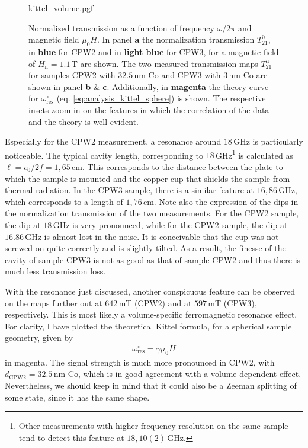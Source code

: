 \begin{figure}[b]
    \centering
    {kittel_volume.pgf}
    \caption[Normalized transmission of samples CPW2 and CPW3]{Normalized transmission as a function of frequency $\omega/2\pi$ and magnetic field $\mu_0H$. In panel \textbf{\color{antiseeblau100}a} the normalization transmission $T_{21}^0$, in \textbf{\color{seeblau100}blue} for CPW2 and in \textbf{\color{seeblau65}light blue} for CPW3, for a magnetic field of $H_\text{n}=1.1\,$T are shown. The two measured transmission maps $T_{21}^\text{n}$ for samples CPW2 with $32.5\,$nm Co and CPW3 with $3\,$nm Co are shown in panel \textbf{\color{antiseeblau100}b} \& \textbf{\color{antiseeblau100}c}. Additionally, in \textbf{\color{antiseeblau100}magenta} the theory curve for $\omega_\text{res}^\circ$ (eq. \ref{eq:analysis_kittel_sphere}) is shown. The respective insets zoom in on the features in which the correlation of the data and the theory is well evident.}
    \label{fig:analysis_kittel_volume}
\end{figure}

Especially for the CPW2 measurement, a resonance around $18\,$GHz is particularly noticeable. The typical cavity length, corresponding to $18\,$GHz\footnote{Other measurements with higher frequency resolution on the same sample tend to detect this feature at $18,10(2)\,$GHz.} is calculated as $\ell=c_0/2f=1,65\,$cm. This corresponds to the distance between the plate to which the sample is mounted and the copper cup that shields the sample from thermal radiation. In the CPW3 sample, there is a similar feature at $16,86\,$GHz, which corresponds to a length of $1,76\,$cm. Note also the expression of the dips in the normalization transmission of the two measurements. For the CPW2 sample, the dip at $18\,$GHz is very pronounced, while for the CPW2 sample, the dip at $16.86\,$GHz is almost lost in the noise. It is conceivable that the cup was not screwed on quite correctly and is slightly tilted. As a result, the finesse of the cavity of sample CPW3 is not as good as that of sample CPW2 and thus there is much less transmission loss.

With the resonance just discussed, another conspicuous feature can be observed on the maps further out at $642\,$mT (CPW2) and at $597\,$mT (CPW3), respectively. This is most likely a volume-specific ferromagnetic resonance effect. For clarity, I have plotted the theoretical Kittel formula, for a spherical sample geometry, given by
\begin{align}
    \omega_\text{res}^\circ=\gamma\mu_0H \label{eq:analysis_kittel_sphere}
\end{align}
in magenta. The signal strength is much more pronounced in CPW2, with $d_\text{CPW2}=32.5\,$nm Co, which is in good agreement with a volume-dependent effect. Nevertheless, we should keep in mind that it could also be a Zeeman splitting of some state, since it has the same shape.

